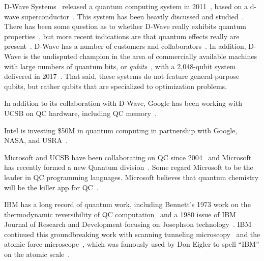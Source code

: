 D-Wave Systems~\cite{D-WaveSystemsHomePage}
released a quantum computing system
in 2011~\cite{WikipediaD-WaveSystems}, based on a d-wave
superconductor~\cite{MHSAmin2000D-Wave-superconductor}.
This system has been heavily discussed and
studied~\cite{KamranKarimi2011D-WaveAdiabatic}.
There has been some question as to whether D-Wave really exhibits quantum
properties~\cite{SeungWooShin2014IsDwaveQuantum}, but more recent
indications are that quantum effects really are
present~\cite{PhysRevA.91.042314,PhysRevX.4.021041}.
D-Wave has a number of customers and
collaborators~\cite{JeffreyBurt2014Google-QC-Chip,PatrickHarris2015QC-Google-NASA-DWave,ToddRWeiss2013Google-QC-AI-Lab}.
In addition, D-Wave is the undisputed champion in the area of commercially
available machines with large numbers of quantum bits, or
\emph{qubits}~\cite{WikipediaD-WaveSystems},
with a 2,048-qubit system delivered in
2017~\cite{AgamShah2016D-Wave-2000-qubit,BradJones2017D-Wave2000Sale}.
That said, these systems do not feature general-purpose qubits, but
rather qubits that are specialized to optimization problems.

In addition to its collaboration with D-Wave, Google has been working
with UCSB on QC hardware, including
QC memory~\cite{JaikumarVijayan2015Google-UCSB-QC-Memory}.

Intel is investing \$50M in quantum computing in partnership
with Google, NASA, and USRA~\cite{StaceyHigginbotham2015Intel-QC-invest-50M}.

Microsoft and UCSB have been collaborating on QC since
2004~\cite{PedroHernandez2014MicrosoftStationQ-QC}
and Microsoft has recently formed a new Quantum
division~\cite{PedroHernandez2016Microsoft-QC}.
Some regard Microsoft to be the leader in QC programming languages.
Microsoft believes that quantum chemistry will be the killer app
for QC~\cite{TomSimonite2017QC-MS-Chemistry}.

IBM has a long record of quantum work, including Bennett's
1973 work on the thermodynamic reversibility of QC
computation~\cite{Bennett:1973:LRC:1664562.1664568} and a 1980 issue
of IBM Journal of Research and Development focusing on Josephson
technology~\cite{1980:1663086}.
IBM continued this groundbreaking work with scanning tunneling
microscopy~\cite{Binnig1982SurfaceSTM}
and the atomic force microscope~\cite{1986PhRvL..56..930B},
which was famously used by Don Eigler to spell ``IBM'' on the atomic
scale~\cite{MalcolmWBrowne1990AFM-IBM}.

